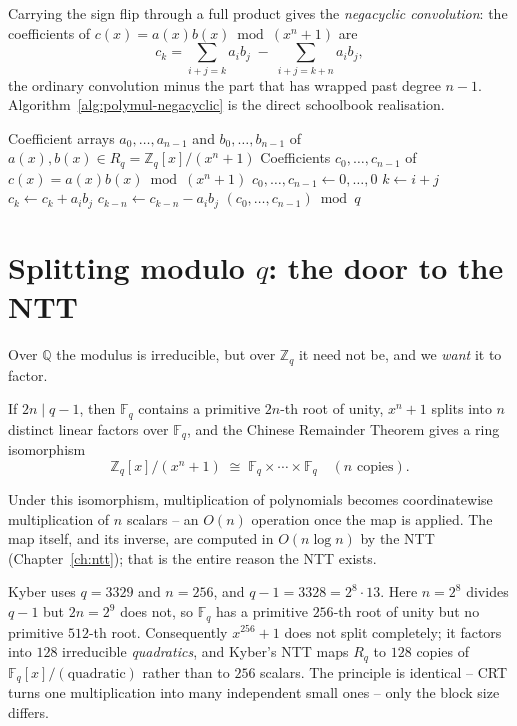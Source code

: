 Carrying the sign flip through a full product gives the \emph{negacyclic convolution}: the coefficients of $c(x)=a(x)b(x) \bmod (x^n+1)$ are
\[
c_k = \sum_{i+j=k} a_i b_j \;-\; \sum_{i+j=k+n} a_i b_j,
\]
the ordinary convolution minus the part that has wrapped past degree $n-1$. Algorithm~\ref{alg:polymul-negacyclic} is the direct schoolbook realisation.

\begin{algorithm}[H]
\caption{Polynomial Multiplication modulo $x^n+1$}
\label{alg:polymul-negacyclic}
\begin{algorithmic}[1]
\Require Coefficient arrays $a_0,\dots,a_{n-1}$ and $b_0,\dots,b_{n-1}$ of $a(x),b(x)\in R_q=\mathbb{Z}_q[x]/(x^n+1)$
\Ensure Coefficients $c_0,\dots,c_{n-1}$ of $c(x)=a(x)b(x)\bmod(x^n+1)$
\State $c_0,\dots,c_{n-1} \gets 0,\dots,0$
        \State $k \gets i+j$
            \State $c_k \gets c_k + a_i b_j$ 
        \Else
            \State $c_{k-n} \gets c_{k-n} - a_i b_j$ 
        \EndIf
    \EndFor
\EndFor
\State \Return $(c_0,\dots,c_{n-1}) \bmod q$
\end{algorithmic}
\end{algorithm}

\section{Splitting modulo $q$: the door to the NTT}
Over $\mathbb{Q}$ the modulus is irreducible, but over $\mathbb{Z}_q$ it need not be, and we \emph{want} it to factor.

\begin{proposition}
If $2n \mid q-1$, then $\mathbb{F}_q$ contains a primitive $2n$-th root of unity, $x^n+1$ splits into $n$ distinct linear factors over $\mathbb{F}_q$, and the Chinese Remainder Theorem gives a ring isomorphism
\[
\mathbb{Z}_q[x]/(x^n+1) \;\cong\; \mathbb{F}_q \times \cdots \times \mathbb{F}_q \quad (n\text{ copies}).
\]
\end{proposition}

Under this isomorphism, multiplication of polynomials becomes coordinatewise multiplication of $n$ scalars -- an $O(n)$ operation once the map is applied. The map itself, and its inverse, are computed in $O(n\log n)$ by the NTT (Chapter~\ref{ch:ntt}); that is the entire reason the NTT exists.

\begin{remark}
Kyber uses $q=3329$ and $n=256$, and $q-1 = 3328 = 2^8\cdot 13$. Here $n=2^8$ divides $q-1$ but $2n=2^9$ does not, so $\mathbb{F}_q$ has a primitive $256$-th root of unity but no primitive $512$-th root. Consequently $x^{256}+1$ does not split completely; it factors into $128$ irreducible \emph{quadratics}, and Kyber's NTT maps $R_q$ to $128$ copies of $\mathbb{F}_q[x]/(\text{quadratic})$ rather than to $256$ scalars. The principle is identical -- CRT turns one multiplication into many independent small ones -- only the block size differs.
\end{remark}

